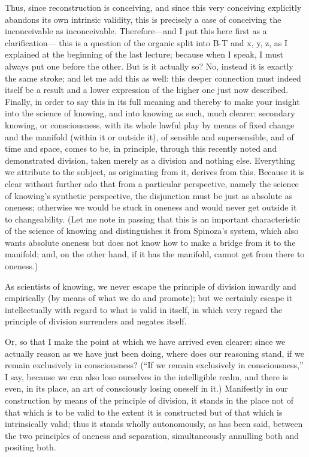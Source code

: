 Thus, since reconstruction is conceiving, and
since this very conceiving explicitly abandons its own intrinsic validity,
this is precisely a case of conceiving the inconceivable as inconceivable.
Therefore—and I put this here first as a clarification—
this is a question of the organic split into
B-T and x, y, z, as I explained at the beginning of the last lecture;
because when I speak, I must always put one before the other.
But is it actually so?
No, instead it is exactly the same stroke;
and let me add this as well:
this deeper connection must indeed itself be a result and
a lower expression of the higher one just now described.
Finally, in order to say this in its full meaning
and thereby to make your insight into the science of knowing,
and into knowing as such, much clearer:
secondary knowing, or consciousness, with its whole lawful play
by means of fixed change and the manifold
(within it or outside it),
of sensible and supersensible,
and of time and space, comes to be, in principle,
through this recently noted and demonstrated division,
taken merely as a division and nothing else.
Everything we attribute to the subject, as originating from it,
derives from this.
Because it is clear without further ado that from a particular perspective,
namely the science of knowing's synthetic perspective,
the disjunction must be just as absolute as oneness;
otherwise we would be stuck in oneness
and would never get outside it to changeability.
(Let me note in passing that this is
an important characteristic of the science of knowing
and distinguishes it from Spinoza's system,
which also wants absolute oneness
but does not know how to make a bridge from it to the manifold;
and, on the other hand, if it has the manifold,
cannot get from there to oneness.)

As scientists of knowing, we never escape
the principle of division inwardly and empirically
(by means of what we do and promote);
but we certainly escape it intellectually
with regard to what is valid in itself,
in which very regard the principle of division
surrenders and negates itself.

Or, so that I make the point at which
we have arrived even clearer:
since we actually reason as we have just been doing,
where does our reasoning stand,
if we remain exclusively in consciousness?
(“If we remain exclusively in consciousness,”
I say, because we can also lose ourselves
in the intelligible realm,
and there is even, in its place,
an art of consciously losing oneself in it.)
Manifestly in our construction
by means of the principle of division,
it stands in the place not of that which is to be
valid to the extent it is constructed
but of that which is intrinsically valid;
thus it stands wholly autonomously, as has been said,
between the two principles of oneness and separation,
simultaneously annulling both and positing both.

